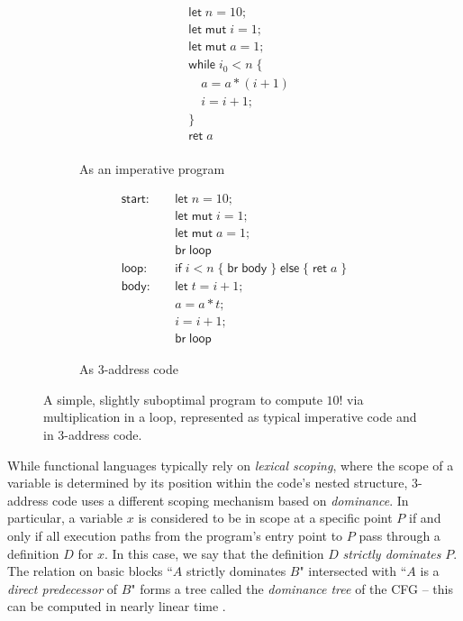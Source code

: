\documentclass[acmsmall,screen,review]{acmart}
\newcommand{\ms}[1]{\ensuremath{\mathsf{#1}}}
\begin{document}
\begin{figure}
  \begin{subfigure}[t]{.5\textwidth}
    \begin{align*}
      & \ms{let}\;n = 10; \\
      & \ms{let\;mut}\;i = 1; \\
      & \ms{let\;mut}\;a = 1; \\
      & \ms{while}\;i_0 < n\;\{ \\
      & \quad a = a * (i + 1) \\
      & \quad i = i + 1; \\
      & \} \\
      & \ms{ret}\;a \\
    \end{align*}
    \caption{As an imperative program}
    \label{fig:fact-imp}
  \end{subfigure}%
  \begin{subfigure}[t]{.5\textwidth}
    \begin{align*}
      \ms{start}:\quad  & \ms{let}\;n = 10; \\
                        & \ms{let\;mut}\;i = 1; \\
                        & \ms{let\;mut}\;a = 1; \\
                        & \ms{br}\;\ms{loop} \\
      \ms{loop}: \quad  & \ms{if}\;i < n\;
                          \{\;\ms{br}\;\ms{body}\;\}\;
                          \ms{else}\;\{\;\ms{ret}\;a\;\} \\
      \ms{body}: \quad  & \ms{let}\;t = i + 1; \\
                        & a = a * t; \\
                        & i = i + 1; \\
                        & \ms{br}\;\ms{loop}
    \end{align*}
    \caption{As 3-address code}
    \label{fig:fact-3addr}
  \end{subfigure}
  \caption{
    A simple, slightly suboptimal program to compute $10!$ via multiplication in a loop, represented
    as typical imperative code and in 3-address code.
  }
  \Description{}
  \label{fig:fact-program}
\end{figure}

While functional languages typically rely on \emph{lexical scoping}, where the scope of a variable
is determined by its position within the code's nested structure, 3-address code uses a different
scoping mechanism based on \emph{dominance}. In particular, a variable $x$ is considered to be in
scope at a specific point $P$ if and only if all execution paths from the program's entry point to
$P$ pass through a definition $D$ for $x$. In this case, we say that the definition $D$
\emph{strictly dominates} $P$. The relation on basic blocks ``$A$ strictly dominates $B$"
intersected with ``$A$ is a \emph{direct predecessor} of $B$" forms a tree called the
\emph{dominance tree} of the CFG -- this can be computed in nearly linear time
\cite{cytron-ssa-intro-91}.
\end{document}
